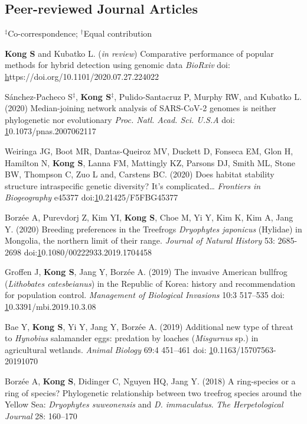 \documentclass[11pt]{article}
\begin{document}
\subsection*{Peer-reviewed Journal Articles}
$^\ddag$Co-correspondence; $^\dag$Equal contribution
\begin{etaremune}

\item \textbf{Kong S} and Kubatko L. (\textit{in review}) Comparative performance of popular methods for hybrid detection using genomic data \textit {BioRxiv} doi: \href{https://doi.org/10.1101/2020.07.27.224022}https://doi.org/10.1101/2020.07.27.224022

\item  Sánchez-Pacheco S{$^\ddag$}, \textbf{Kong S}{$^\ddag$}, Pulido-Santacruz P, Murphy RW, and Kubatko L. (2020) Median-joining network analysis of SARS-CoV-2 genomes is neither phylogenetic nor evolutionary \textit{Proc. Natl. Acad. Sci. U.S.A} doi: \href{https://doi.org/10.1073/pnas.2007062117}10.1073/pnas.2007062117
\item Weiringa JG, Boot MR,  Dantas-Queiroz MV, Duckett D, Fonseca EM, Glon H, Hamilton N, \textbf{Kong S}, Lanna FM, Mattingly KZ, Parsons DJ, Smith ML, Stone BW, Thompson C, Zuo L and, Carstens BC. (2020) Does habitat stability structure intraspecific genetic diversity? It’s complicated… \textit{Frontiers in Biogeography} e45377 doi:\href{https://doi.org/10.21425/F5FBG45377}10.21425/F5FBG45377
\item Borzée A, Purevdorj Z, Kim YI, \textbf{Kong S}, Choe M, Yi Y, Kim K, Kim A, Jang Y. (2020) Breeding preferences in the Treefrogs \textit{Dryophytes japonicus} (Hylidae) in Mongolia, the northern limit of their range. \textit{Journal of Natural History} 53: 2685-2698 doi:\href{10.1080/00222933.2019.1704458}10.1080/00222933.2019.1704458
\item Groffen J, \textbf{Kong S}, Jang Y, Borzée A. (2019) The invasive American bullfrog (\textit{Lithobates catesbeianus}) in the Republic of Korea: history and recommendation for population control. \textit{Management of Biological Invasions} 10:3 517–535 doi: \href{10.3391/mbi.2019.10.3.08}10.3391/mbi.2019.10.3.08
\item Bae Y, \textbf{Kong S}, Yi Y, Jang Y, Borzée A. (2019) Additional new type of threat to \textit{Hynobius} salamander eggs: predation by loaches (\textit{Misgurnus} sp.) in agricultural wetlands. \textit{Animal Biology} 69:4 451–461 doi: \href{https://doi.org/10.1163/15707563-20191070}10.1163/15707563-20191070
\item Borzée A,\textbf{ Kong S}, Didinger C, Nguyen HQ, Jang Y. (2018) A ring-species or a ring of species? Phylogenetic relationship between two treefrog species around the Yellow Sea: \textit{Dryophytes suweonensis }and \textit{D. immaculatus}. \textit{The Herpetological Journal} 28: 160–170 

\end{etaremune}
\end{document}
